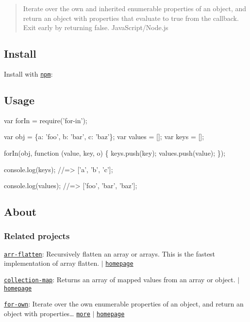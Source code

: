 \begin{quote}
Iterate over the own and inherited enumerable properties of an object, and return an object with properties that evaluate to true from the callback. Exit early by returning {\ttfamily false}. Java\+Script/\+Node.\+js \end{quote}


\subsection*{Install}

Install with \href{https://www.npmjs.com/}{\tt npm}\+:




\subsection*{Usage}


\begin{DoxyCode}
var forIn = require('for-in');

var obj = \{a: 'foo', b: 'bar', c: 'baz'\};
var values = [];
var keys = [];

forIn(obj, function (value, key, o) \{
  keys.push(key);
  values.push(value);
\});

console.log(keys);
//=> ['a', 'b', 'c'];

console.log(values);
//=> ['foo', 'bar', 'baz'];
\end{DoxyCode}


\subsection*{About}

\subsubsection*{Related projects}


\begin{DoxyItemize}
\item \href{https://www.npmjs.com/package/arr-flatten}{\tt arr-\/flatten}\+: Recursively flatten an array or arrays. This is the fastest implementation of array flatten. $\vert$ \href{https://github.com/jonschlinkert/arr-flatten}{\tt homepage}
\item \href{https://www.npmjs.com/package/collection-map}{\tt collection-\/map}\+: Returns an array of mapped values from an array or object. $\vert$ \href{https://github.com/jonschlinkert/collection-map}{\tt homepage}
\item \href{https://www.npmjs.com/package/for-own}{\tt for-\/own}\+: Iterate over the own enumerable properties of an object, and return an object with properties… \href{https://github.com/jonschlinkert/for-own}{\tt more} $\vert$ \href{https://github.com/jonschlinkert/for-own}{\tt homepage}
\end{DoxyItemize}

